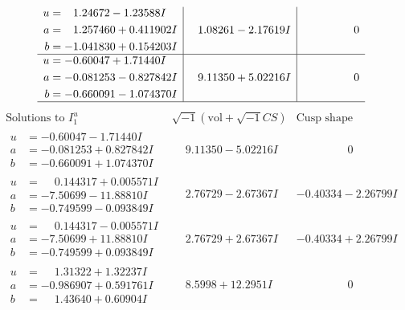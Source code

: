 \documentclass[1p]{elsarticle_modified}
\theoremstyle{definition}
\newcommand{\I}{\sqrt{-1}}
\begin{document}
$$\begin{array}{c|c|c}
\begin{aligned}
u &= \phantom{-}1.24672 - 1.23588 I \\
a &= \phantom{-}1.257460 + 0.411902 I \\
b &= -1.041830 + 0.154203 I\end{aligned}
 & \phantom{-}1.08261 - 2.17619 I & \phantom{-0.000000 } 0 \\ \hline\begin{aligned}
u &= -0.60047 + 1.71440 I \\
a &= -0.081253 - 0.827842 I \\
b &= -0.660091 - 1.074370 I\end{aligned}
 & \phantom{-}9.11350 + 5.02216 I & \phantom{-0.000000 } 0\\
 \hline 
 \end{array}$$\newpage$$\begin{array}{c|c|c}  
\text{Solutions to }I^u_{1}& \I (\text{vol} + \sqrt{-1}CS) & \text{Cusp shape}\\
 \hline 
\begin{aligned}
u &= -0.60047 - 1.71440 I \\
a &= -0.081253 + 0.827842 I \\
b &= -0.660091 + 1.074370 I\end{aligned}
 & \phantom{-}9.11350 - 5.02216 I & \phantom{-0.000000 } 0 \\ \hline\begin{aligned}
u &= \phantom{-}0.144317 + 0.005571 I \\
a &= -7.50699 - 11.88810 I \\
b &= -0.749599 - 0.093849 I\end{aligned}
 & \phantom{-}2.76729 - 2.67367 I & -0.40334 - 2.26799 I \\ \hline\begin{aligned}
u &= \phantom{-}0.144317 - 0.005571 I \\
a &= -7.50699 + 11.88810 I \\
b &= -0.749599 + 0.093849 I\end{aligned}
 & \phantom{-}2.76729 + 2.67367 I & -0.40334 + 2.26799 I \\ \hline\begin{aligned}
u &= \phantom{-}1.31322 + 1.32237 I \\
a &= -0.986907 + 0.591761 I \\
b &= \phantom{-}1.43640 + 0.60904 I\end{aligned}
 & \phantom{-}8.5998 + 12.2951 I & \phantom{-0.000000 } 0 \\ \hline\begin{aligned}

\end{aligned}
\end{array}$$
\end{document}
